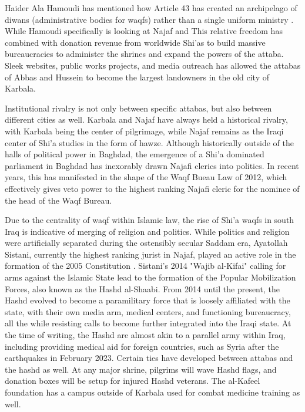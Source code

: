 Haider Ala Hamoudi has mentioned how Article 43 has created an archipelago of diwans (administrative bodies for waqfs) rather than a single uniform ministry \cite[220]{hamoudi_engagements_2020}. While Hamoudi specifically is looking at Najaf and   This relative freedom has combined with donation revenue from worldwide Shi'as to build massive bureaucracies to administer the shrines and expand the powers of the attaba. Sleek websites, public works projects, and media outreach has allowed the attabas of Abbas and Hussein to become the largest landowners in the old city of Karbala. 

Institutional rivalry is not only between specific attabas, but also between different cities as well. Karbala and Najaf have always held a historical rivalry, with Karbala being the center of pilgrimage, while Najaf remains as the Iraqi center of Shi'a studies in the form of hawze. Although historically outside of the halls of political power in Baghdad, the emergence of a Shi'a dominated parliament in Baghdad has inexorably drawn Najafi clerics into politics. In recent years, this has manifested in the shape of the Waqf Bueau Law of 2012, which effectively gives veto power to the highest ranking Najafi cleric for the nominee of the head of the Waqf Bureau. 

Due to the centrality of waqf within Islamic law, the rise of Shi'a waqfs in south Iraq is indicative of merging of religion and politics. While politics and religion were artificially separated during the ostensibly secular Saddam era, Ayatollah Sistani, currently the highest ranking jurist in Najaf, played an active role in the formation of the 2005 Constitution \cite[146]{nakash_reaching_2006}. Sistani's 2014 "Wajib al-Kifai" calling for arms against the Islamic State lead to the formation of the Popular Mobilization Forces, also known as the Hashd al-Shaabi. From 2014 until the present, the Hashd evolved to become a paramilitary force that is loosely affiliated with the state, with their own media arm, medical centers, and functioning bureaucracy, all the while resisting calls to become further integrated into the Iraqi state. At the time of writing, the Hashd are almost akin to a parallel army within Iraq, including providing medical aid for foreign countries, such as Syria after the earthquakes in February 2023. Certain ties have developed between attabas and the hashd as well. At any major shrine, pilgrims will wave Hashd flags, and donation boxes will be setup for injured Hashd veterans. The al-Kafeel foundation has a campus outside of Karbala used for combat medicine training as well. 

